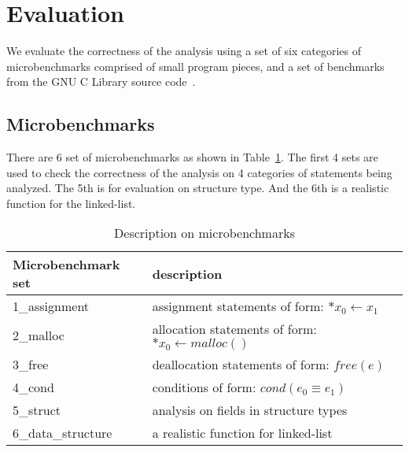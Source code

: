 \section{Evaluation}
\label{s:evaluation}

We evaluate the correctness of the analysis using a set of six categories of 
microbenchmarks comprised of small program pieces, and a set of benchmarks 
from the GNU C Library source code~\cite{glibc}.

\subsection{Microbenchmarks}
\label{microbenchmark}

There are 6 set of microbenchmarks as shown in Table~\ref{tbl:micro}. 
The first 4 sets are used to check the correctness of the analysis on 4 
categories of statements being analyzed. The 5th is for evaluation on 
structure type. And the 6th is a realistic function for the linked-list.



\begin{table}[t!]
  \centering
    \begin{tabular}{|l|l|}
    \hline
    Microbenchmark set & description\\
    \hline
    \hline
    1\_assignment & assignment statements of form: $*x_0\gets x_1$ \\
    \hline
    2\_malloc & allocation statements of form: $*x_0\gets malloc()$ \\
    \hline
    3\_free & deallocation statements of form: $free(e)$ \\
    \hline
    4\_cond & conditions of form: $cond(e_0\equiv e_1)$ \\
    \hline
    5\_struct & analysis on fields in structure types \\
    \hline
    6\_data\_structure & a realistic function for linked-list \\
    \hline
    \end{tabular}
    \caption{\label{tbl:micro} Description on microbenchmarks}
\end{table}


